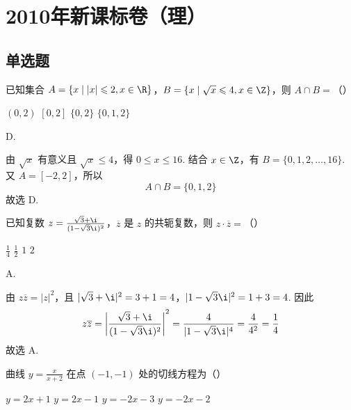 \chapter{2010年新课标卷（理）}

\section{单选题}

\begin{problem}
已知集合 \(A = \{x \mid |x| \leqslant 2, x \in \R\}\)，\(B = \{x \mid \sqrt{x} \leqslant 4, x \in \Z\}\)，则 \(A \cap B =\)（\quad）

\choices
    {\((0,2)\)}
    {\([0,2]\)}
    {\(\{0,2\}\)}
    {\(\{0,1,2\}\)}
\end{problem}

\begin{answer}
D.
\end{answer}

\begin{solution}
由 \(\sqrt{x}\) 有意义且 \(\sqrt{x}\leqslant4\)，得 \(0\leqslant x\leqslant16\). 结合 \(x\in\Z\)，有 \(B=\{0,1,2,\ldots,16\}\). 又 \(A=[-2,2]\)，所以
\[
A\cap B=\{0,1,2\}
\]
故选 D.
\end{solution}

\begin{problem}
已知复数 \(z = \frac{\sqrt{3} + \i}{(1 - \sqrt{3}\i)^2}\)，\(\overline{z}\) 是 \(z\) 的共轭复数，则 \(z \cdot \overline{z} =\)（\quad）

\choices
    {\(\frac{1}{4}\)}
    {\(\frac{1}{2}\)}
    {\(1\)}
    {\(2\)}
\end{problem}

\begin{answer}
A.
\end{answer}

\begin{solution}
由 \(z\overline{z}=|z|^{2}\)，且
\(|\sqrt{3}+\i|^{2}=3+1=4\)，\(|1-\sqrt{3}\i|^{2}=1+3=4\).
因此
\[
z\overline{z}=\left|\frac{\sqrt{3}+\i}{(1-\sqrt{3}\i)^2}\right|^{2}
=\frac{4}{|1-\sqrt{3}\i|^{4}}
=\frac{4}{4^{2}}=\frac14
\]
故选 A.
\end{solution}

\begin{problem}
曲线 \( y = \frac{x}{x + 2} \) 在点 \((-1, -1)\) 处的切线方程为（\quad）

\choices
    {\( y = 2x + 1 \)}
    {\( y = 2x - 1 \)}
    {\( y = -2x - 3 \)}
    {\(y = -2x - 2\)}
\end{problem}

